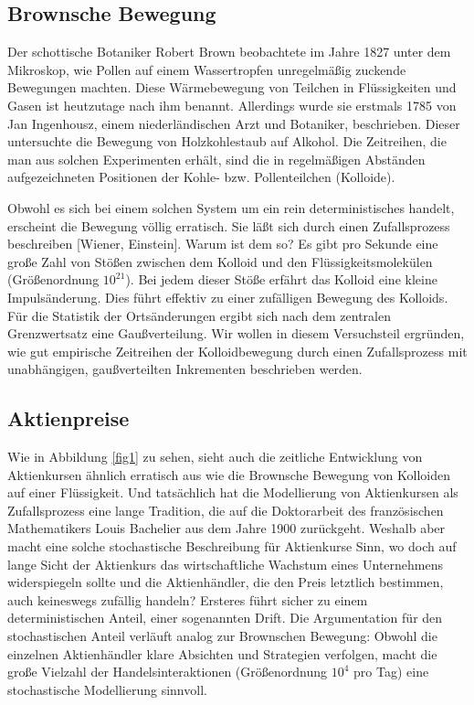 \documentclass[a4paper,10pt]{article}
\begin{document}
\subsection{Brownsche Bewegung}
Der schottische Botaniker Robert Brown beobachtete im Jahre 1827 unter dem Mikroskop, wie Pollen auf einem Wassertropfen unregelmäßig zuckende Bewegungen machten.
Diese Wärmebewegung von Teilchen in Flüssigkeiten und Gasen ist heutzutage nach ihm benannt. Allerdings wurde sie erstmals 1785 von Jan Ingenhousz, einem  niederländischen Arzt und Botaniker, beschrieben. Dieser untersuchte die Bewegung von Holzkohlestaub auf Alkohol. Die Zeitreihen, die man aus solchen Experimenten erhält, sind die in regelmäßigen Abständen aufgezeichneten Positionen der Kohle- bzw. Pollenteilchen (Kolloide).

Obwohl es sich bei einem solchen System um ein rein deterministisches handelt, erscheint die Bewegung völlig erratisch. Sie läßt sich durch einen Zufallsprozess beschreiben [Wiener, Einstein]. Warum ist dem so? Es gibt pro Sekunde eine große Zahl von Stößen zwischen dem Kolloid und den Flüssigkeitsmolekülen (Größenordnung $10^{21}$). Bei jedem dieser Stöße erfährt das Kolloid eine kleine Impulsänderung.
Dies führt effektiv zu einer zufälligen Bewegung des Kolloids. Für die Statistik der Ortsänderungen ergibt sich nach dem zentralen Grenzwertsatz eine Gaußverteilung.
Wir wollen in diesem Versuchsteil ergründen, wie gut empirische Zeitreihen der Kolloidbewegung durch einen Zufallsprozess mit unabhängigen, gaußverteilten Inkrementen beschrieben werden.




\subsection{Aktienpreise}
Wie in Abbildung \ref{fig1} zu sehen, sieht auch die zeitliche Entwicklung von Aktienkursen ähnlich erratisch aus wie die Brownsche Bewegung von Kolloiden auf einer Flüssigkeit.
Und tatsächlich hat die Modellierung von Aktienkursen als Zufallsprozess eine lange Tradition, die auf die Doktorarbeit des französischen Mathematikers Louis Bachelier aus dem Jahre 1900 zurückgeht. 
Weshalb aber macht eine solche stochastische Beschreibung für Aktienkurse Sinn, wo doch auf lange Sicht der Aktienkurs das wirtschaftliche Wachstum eines Unternehmens widerspiegeln sollte und die Aktienhändler, die den Preis letztlich bestimmen, auch keineswegs zufällig handeln?
Ersteres führt sicher zu einem deterministischen Anteil, einer sogenannten Drift.
Die Argumentation für den stochastischen Anteil verläuft analog zur Brownschen Bewegung: Obwohl die einzelnen Aktienhändler klare Absichten und Strategien verfolgen, macht die große Vielzahl der Handelsinteraktionen (Größenordnung $10^4$ pro Tag) eine stochastische Modellierung sinnvoll. 
\end{document}
